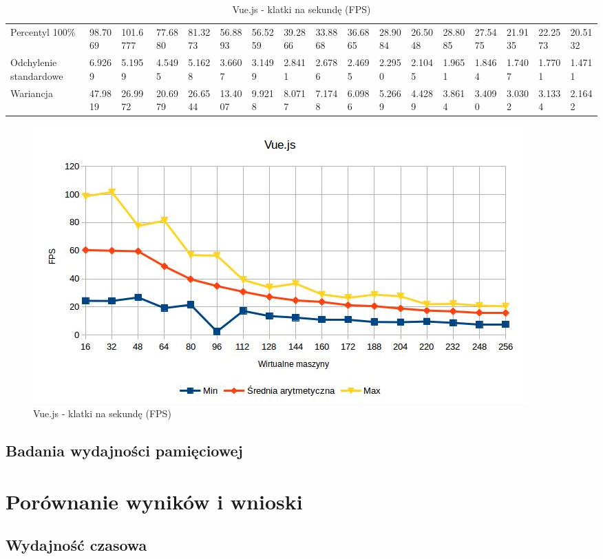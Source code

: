 \documentclass[polish, twoside, 12pt]{mwart}
\let\stdsection\section
\renewcommand*{\section}{\clearpage\stdsection}
\begin{document}
\begin{table}[]
{\begin{tabular}{@{}lllllllllllllllll@{}}
  Percentyl 100\%        & 98.7069 & 101.6777 & 77.6880 & 81.3273 & 56.8893 & 56.5259 & 39.2866 & 33.8868 & 36.6865 & 28.9084 & 26.5048 & 28.8085 & 27.5475 & 21.9135 & 22.2573 & 20.5132 \\
  Odchylenie standardowe & 6.9269  & 5.1959   & 4.5495  & 5.1628  & 3.6607  & 3.1499  & 2.8411  & 2.6786  & 2.4695  & 2.2950  & 2.1045  & 1.9651  & 1.8464  & 1.7407  & 1.7701  & 1.4711  \\
  Wariancja              & 47.9819 & 26.9972  & 20.6979 & 26.6544 & 13.4007 & 9.9218  & 8.0717  & 7.1748  & 6.0986  & 5.2669  & 4.4289  & 3.8614  & 3.4090  & 3.0302  & 3.1334  & 2.1642  \\ \bottomrule
  \end{tabular}%
  }
  \caption{Vue.js - klatki na sekundę (FPS)}
\end{table}

\begin{figure}[ht]
  \includegraphics[width=\textwidth]{vue-fps.jpg}
	\caption{Vue.js - klatki na sekundę (FPS)}
\end{figure}

\subsection{Badania wydajności pamięciowej}

\section{Porównanie wyników i wnioski}

\subsection{Wydajność czasowa}
\end{document}
